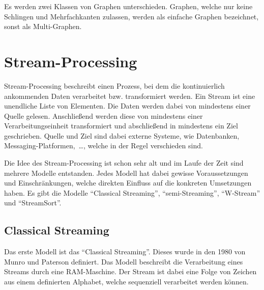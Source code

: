 
Es werden zwei Klassen von Graphen unterschieden. Graphen, welche nur keine
Schlingen und Mehrfachkanten zulassen, werden als einfache Graphen bezeichnet,
sonst als Multi-Graphen.


\section{Stream-Processing}
Stream-Processing beschreibt einen Prozess, bei dem die kontinuierlich
ankommenden Daten verarbeitet bzw. transformiert werden. Ein Stream ist eine
unendliche Liste von Elementen. Die Daten werden dabei von mindestens einer
Quelle gelesen. Anschließend werden diese von mindestens einer Verarbeitungseinheit
transformiert und abschließend in mindestens ein Ziel geschrieben. Quelle und
Ziel sind dabei externe Systeme, wie Datenbanken, Messaging-Platformen,~\dots,
welche in der Regel verschieden sind.

Die Idee des Stream-Processing ist schon sehr alt und im Laufe der Zeit sind
mehrere Modelle entstanden. Jedes Modell hat dabei gewisse Voraussetzungen
und Einschränkungen, welche direkten Einfluss auf die konkreten Umsetzungen
haben. Es gibt die Modelle \enquote{Classical Streaming}, \enquote{semi-Streaming},
\enquote{W-Stream} und \enquote{StreamSort}.

\subsection{Classical Streaming}
Das erste Modell ist das \enquote{Classical Streaming}. Dieses wurde in den
1980 von Munro und Paterson definiert. Das Modell beschreibt die Verarbeitung
eines Streams durch eine \gls{RAM}-Maschine. Der Stream ist dabei eine Folge von
Zeichen aus einem definierten Alphabet, welche sequenziell verarbeitet werden
können.

